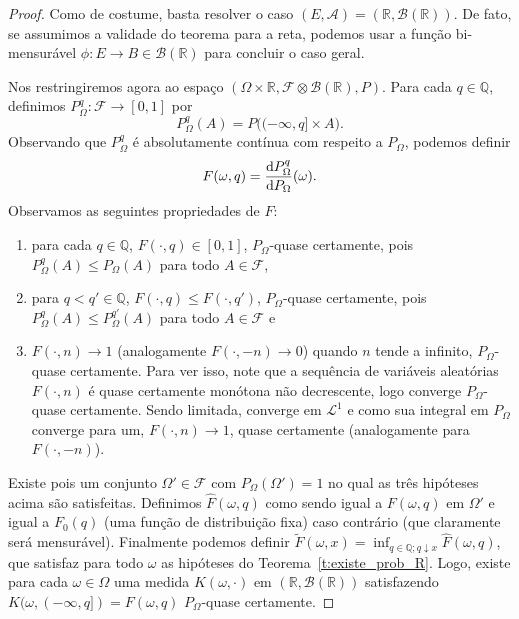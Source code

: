 \documentclass[../Notas_de_aula.tex]{subfiles}
\begin{document}
\begin{proof}
  Como de costume, basta resolver o caso $(E, \mathcal{A}) = (\mathbb{R}, \mathcal{B}(\mathbb{R}))$.
  De fato, se assumimos a validade do teorema para a reta, podemos usar a função bi-mensurável $\phi: E \to B \in \mathcal{B}(\mathbb{R})$ para concluir o caso geral.

  Nos restringiremos agora ao espaço $(\Omega \times \mathbb{R}, \mathcal{F} \otimes \mathcal{B}(\mathbb{R}), P)$.
  Para cada $q \in \mathbb{Q}$, definimos $P^q_\Omega : \mathcal{F} \to [0,1]$ por
  \begin{equation}
    P^q_\Omega (A) = P\big( (-\infty, q] \times A \big).
  \end{equation}
  Observando que $P^q_\Omega$ é absolutamente contínua com respeito a $P_\Omega$, podemos definir
  \begin{equation}
    F(\omega, q) = \frac{\mathop{}\!\mathrm{d} P^q_\Omega}{\mathop{}\!\mathrm{d} P_\Omega}(\omega).
  \end{equation}
  Observamos as seguintes propriedades de $F$:
  \begin{enumerate}[\quad a)]
  \item para cada $q \in \mathbb{Q}$, $F(\cdot, q) \in [0,1]$, $P_\Omega$-quase certamente, pois $P^q_\Omega(A) \leq P_\Omega(A)$ para todo $A \in \mathcal{F}$,
  \item para $q < q' \in \mathbb{Q}$, $F(\cdot, q) \leq F(\cdot, q')$, $P_\Omega$-quase certamente, pois $P^q_\Omega(A) \leq P^{q'}_\Omega(A)$ para todo $A \in \mathcal{F}$ e
  \item $F(\cdot, n) \to 1$ (analogamente $F(\cdot, -n) \to 0$) quando $n$ tende a infinito, $P_\Omega$-quase certamente.
    Para ver isso, note que a sequência de variáveis aleatórias $F(\cdot, n)$ é quase certamente monótona não decrescente, logo converge $P_\Omega$-quase certamente.
    Sendo limitada, converge em $\mathcal{L}^1$ e como sua integral em $P_\Omega$ converge para um, $F(\cdot, n) \to 1$, quase certamente (analogamente para $F(\cdot, -n)$).
  \end{enumerate}
  Existe pois um conjunto $\Omega' \in \mathcal{F}$ com $P_\Omega(\Omega') = 1$ no qual as três hipóteses acima são satisfeitas.
  Definimos $\hat{F}(\omega, q)$ como sendo igual a $F(\omega, q)$ em $\Omega'$ e igual a $F_0(q)$ (uma função de distribuição fixa) caso contrário (que claramente será mensurável).
  Finalmente podemos definir $\tilde{F}(\omega, x) = \inf_{q \in \mathbb{Q}; q \downarrow x} \hat{F}(\omega, q)$, que satisfaz para todo $\omega$ as hipóteses do Teorema~\ref{t:existe_prob_R}.
  Logo, existe para cada $\omega \in \Omega$ uma medida $K(\omega, \cdot)$ em $(\mathbb{R}, \mathcal{B}(\mathbb{R}))$ satisfazendo $K(\omega,(-\infty, q]) = F(\omega, q)$ $P_\Omega$-quase certamente.


\end{proof}
\end{document}
